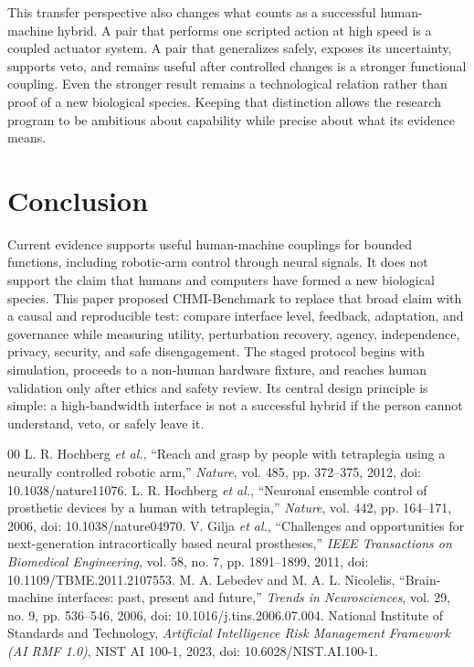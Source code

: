\documentclass[conference]{IEEEtran}
\begin{document}
This transfer perspective also changes what counts as a successful human-machine hybrid. A pair that performs one scripted action at high speed is a coupled actuator system. A pair that generalizes safely, exposes its uncertainty, supports veto, and remains useful after controlled changes is a stronger functional coupling. Even the stronger result remains a technological relation rather than proof of a new biological species. Keeping that distinction allows the research program to be ambitious about capability while precise about what its evidence means.

\section{Conclusion}

Current evidence supports useful human-machine couplings for bounded functions, including robotic-arm control through neural signals. It does not support the claim that humans and computers have formed a new biological species. This paper proposed CHMI-Benchmark to replace that broad claim with a causal and reproducible test: compare interface level, feedback, adaptation, and governance while measuring utility, perturbation recovery, agency, independence, privacy, security, and safe disengagement. The staged protocol begins with simulation, proceeds to a non-human hardware fixture, and reaches human validation only after ethics and safety review. Its central design principle is simple: a high-bandwidth interface is not a successful hybrid if the person cannot understand, veto, or safely leave it.

\balance
\begin{thebibliography}{00}
 L. R. Hochberg \textit{et al.}, ``Reach and grasp by people with tetraplegia using a neurally controlled robotic arm,'' \textit{Nature}, vol. 485, pp. 372--375, 2012, doi: 10.1038/nature11076.
 L. R. Hochberg \textit{et al.}, ``Neuronal ensemble control of prosthetic devices by a human with tetraplegia,'' \textit{Nature}, vol. 442, pp. 164--171, 2006, doi: 10.1038/nature04970.
 V. Gilja \textit{et al.}, ``Challenges and opportunities for next-generation intracortically based neural prostheses,'' \textit{IEEE Transactions on Biomedical Engineering}, vol. 58, no. 7, pp. 1891--1899, 2011, doi: 10.1109/TBME.2011.2107553.
 M. A. Lebedev and M. A. L. Nicolelis, ``Brain-machine interfaces: past, present and future,'' \textit{Trends in Neurosciences}, vol. 29, no. 9, pp. 536--546, 2006, doi: 10.1016/j.tins.2006.07.004.
 National Institute of Standards and Technology, \textit{Artificial Intelligence Risk Management Framework (AI RMF 1.0)}, NIST AI 100-1, 2023, doi: 10.6028/NIST.AI.100-1.
\end{thebibliography}
\end{document}
